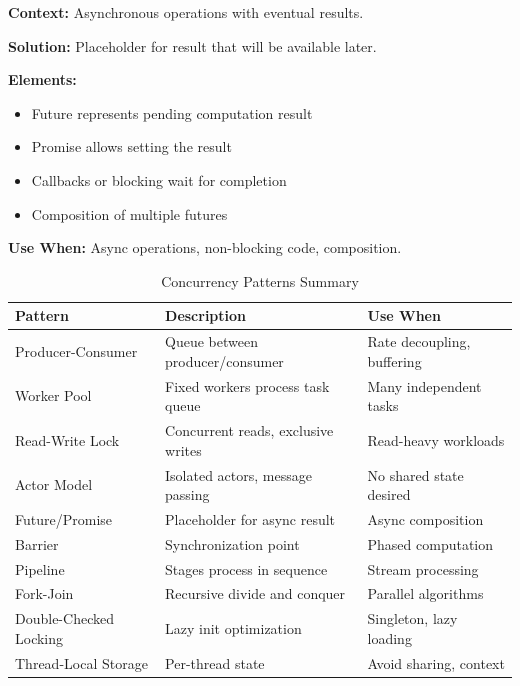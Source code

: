 \documentclass[11pt,letterpaper]{article}
\begin{document}
\begin{patternbox}
\textbf{Context:} Asynchronous operations with eventual results.

\textbf{Solution:} Placeholder for result that will be available later.

\textbf{Elements:}
\begin{itemize}[nosep]
    \item Future represents pending computation result
    \item Promise allows setting the result
    \item Callbacks or blocking wait for completion
    \item Composition of multiple futures
\end{itemize}

\textbf{Use When:} Async operations, non-blocking code, composition.
\end{patternbox}

\begin{table}[H]
\centering
\caption{Concurrency Patterns Summary}
\small
\begin{tabular}{@{}L{2.8cm}L{4.2cm}L{5.5cm}@{}}
\toprule
\textbf{Pattern} & \textbf{Description} & \textbf{Use When} \\
\midrule
Producer-Consumer & Queue between producer/consumer & Rate decoupling, buffering \\
\addlinespace
Worker Pool & Fixed workers process task queue & Many independent tasks \\
\addlinespace
Read-Write Lock & Concurrent reads, exclusive writes & Read-heavy workloads \\
\addlinespace
Actor Model & Isolated actors, message passing & No shared state desired \\
\addlinespace
Future/Promise & Placeholder for async result & Async composition \\
\addlinespace
Barrier & Synchronization point & Phased computation \\
\addlinespace
Pipeline & Stages process in sequence & Stream processing \\
\addlinespace
Fork-Join & Recursive divide and conquer & Parallel algorithms \\
\addlinespace
Double-Checked Locking & Lazy init optimization & Singleton, lazy loading \\
\addlinespace
Thread-Local Storage & Per-thread state & Avoid sharing, context \\
\bottomrule
\end{tabular}
\end{table}
\end{document}
